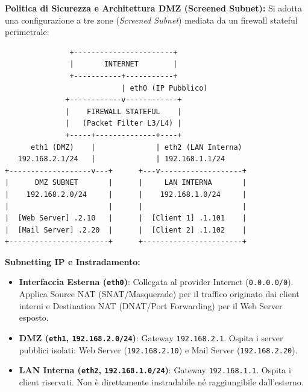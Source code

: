 \documentclass[11pt,a4paper]{article}
\begin{document}
\begin{solutionbox}
\textbf{Politica di Sicurezza e Architettura DMZ (Screened Subnet):}
Si adotta una configurazione a tre zone (\textit{Screened Subnet}) mediata da un firewall stateful perimetrale:
\begin{center}
\begin{verbatim}
               +-----------------------+
               |       INTERNET        |
               +-----------+-----------+
                           | eth0 (IP Pubblico)
              +------------v------------+
              |    FIREWALL STATEFUL    |
              |   (Packet Filter L3/L4) |
              +-----+--------------+----+
      eth1 (DMZ)    |              | eth2 (LAN Interna)
   192.168.2.1/24   |              | 192.168.1.1/24
+-------------------v---+      +---v-------------------+
|      DMZ SUBNET       |      |     LAN INTERNA       |
|    192.168.2.0/24     |      |    192.168.1.0/24     |
|                       |      |                       |
|  [Web Server] .2.10   |      |  [Client 1] .1.101    |
|  [Mail Server] .2.20  |      |  [Client 2] .1.102    |
+-----------------------+      +-----------------------+
\end{verbatim}
\end{center}

\textbf{Subnetting IP e Instradamento:}
\begin{itemize}
    \item \textbf{Interfaccia Esterna (\texttt{eth0})}: Collegata al provider Internet (\texttt{0.0.0.0/0}). Applica Source NAT (SNAT/Masquerade) per il traffico originato dai client interni e Destination NAT (DNAT/Port Forwarding) per il Web Server esposto.
    \item \textbf{DMZ (\texttt{eth1}, \texttt{192.168.2.0/24})}: Gateway \texttt{192.168.2.1}. Ospita i server pubblici isolati: Web Server (\texttt{192.168.2.10}) e Mail Server (\texttt{192.168.2.20}).
    \item \textbf{LAN Interna (\texttt{eth2}, \texttt{192.168.1.0/24})}: Gateway \texttt{192.168.1.1}. Ospita i client riservati. Non \`e direttamente instradabile n\'e raggiungibile dall'esterno.
\end{itemize}


\end{solutionbox}
\end{document}
